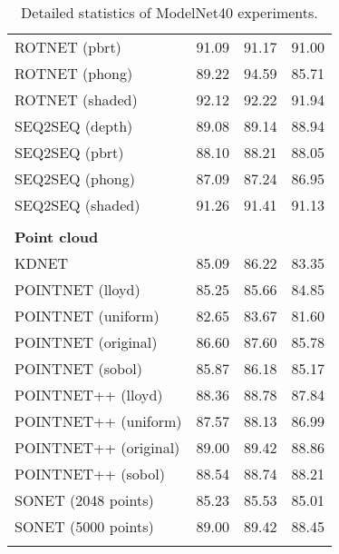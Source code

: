 \begin{table}[!h]
\begin{tabular}{lccc}
	    	ROTNET (pbrt)          &     91.09     &    91.17     &    91.00     \\
	    	ROTNET (phong)         &     89.22     &    94.59     &    85.71     \\
	    	ROTNET (shaded)        &     92.12     &    92.22     &    91.94     \\
	    	SEQ2SEQ (depth)        &     89.08     &    89.14     &    88.94     \\
	    	SEQ2SEQ (pbrt)         &     88.10     &    88.21     &    88.05     \\
	    	SEQ2SEQ (phong)        &     87.09     &    87.24     &    86.95     \\
	    	SEQ2SEQ (shaded)       &     91.26     &    91.41     &    91.13     \\\hline
	    	                       &               &              &              \\
	    	\textbf{Point cloud  } &               &              &              \\
	    	KDNET                  &     85.09     &    86.22     &    83.35     \\
	    	POINTNET (lloyd)       &     85.25     &    85.66     &    84.85     \\
	    	POINTNET (uniform)     &     82.65     &    83.67     &    81.60     \\
	    	POINTNET (original)    &     86.60     &    87.60     &    85.78     \\
	    	POINTNET (sobol)       &     85.87     &    86.18     &    85.17     \\
	    	POINTNET++ (lloyd)     &     88.36     &    88.78     &    87.84     \\
	    	POINTNET++ (uniform)   &     87.57     &    88.13     &    86.99     \\
	    	POINTNET++ (original)   &     89.00     &    89.42     &    88.86     \\
	    	POINTNET++ (sobol)     &     88.54     &    88.74     &    88.21     \\
	    	SONET (2048 points)    &     85.23     &    85.53     &    85.01     \\
	    	SONET (5000 points)    &     89.00     &    89.42     &    88.45     \\  \hline
	    		    	                       &               &              &              \\ 
	    \end{tabular}
\caption{Detailed statistics of ModelNet40 experiments.}
\label{Table:details}
\end{table}

